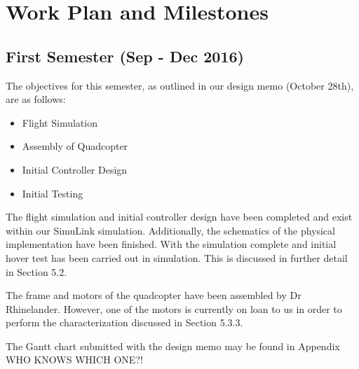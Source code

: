\section{Work Plan and Milestones}

\subsection{First Semester (Sep - Dec 2016)}
The objectives for this semester, as outlined in our design memo (October 28th), are as follows:

\begin{itemize}
	\item Flight Simulation
	\item Assembly of Quadcopter
	\item Initial Controller Design
	\item Initial Testing
\end{itemize}

The flight simulation and initial controller design have been completed and exist within our SimuLink simulation.  Additionally, the schematics of the physical implementation have been finished.  With the simulation complete and initial hover test has been carried out in simulation.  This is discussed in further detail in Section 5.2.

The frame and motors of the quadcopter have been assembled by Dr Rhinelander.  However, one of the motors is currently on loan to us in order to perform the characterization discussed in Section 5.3.3.

The Gantt chart submitted with the design memo may be found in Appendix WHO KNOWS WHICH ONE?!

